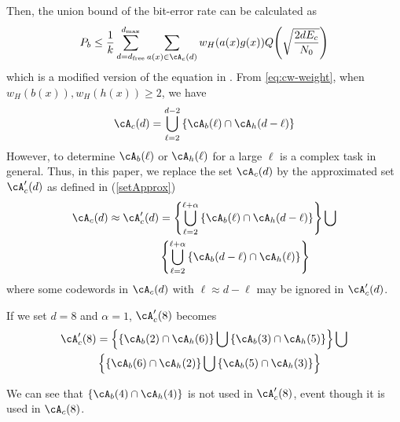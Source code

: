 Then, the union bound of the bit-error rate can be calculated as 
\begin{align}
P_b \leq \frac{1}{k} \sum_{d=d_{\text{free}}}^{d_{\text{max}}} \sum_{a(x) \in \cA_c(d)}w_H(a(x)g(x)) Q\Bigg( \sqrt{\frac{2dE_c}{N_0}}\Bigg)
\label{novelEq7}
\end{align}
which is a modified version of the equation in \cite{ref4} .
From \eqref{eq:cw-weight}, when $w_H(b(x)), w_H(h(x)) \geq 2$, we have
\begin{align}
\cA_c(d) = \bigcup_{\ell = 2}^{d-2} \left\{\cA_b(\ell) \cap \cA_h(d-\ell)\right\}
\label{Eq:exactset}
\end{align}
However, to determine $\cA_b(\ell)$ or $\cA_h(\ell)$ for a large $\ell$ is a complex task in general. Thus, in this paper, we replace the set $\cA_c(d)$ by the approximated set $\cA_c'(d)$ as defined in  (\ref{setApprox})
\begin{equation}
\begin{split}
\cA_c(d) \approx \cA_c'(d) &= \left\{\bigcup_{\ell = 2}^{\ell+\alpha} \left\{\cA_b(\ell) \cap \cA_h(d-\ell)\right\}\right\}\bigcup \\
&\left\{\bigcup_{\ell = 2}^{\ell+\alpha} \left\{\cA_b(d-\ell) \cap \cA_h(\ell)\right\}\right\}
\end{split}
\label{setApprox}
\end{equation}
where some codewords in $\cA_c(d)$ with $\ell \approx d-\ell$ may be ignored in $\cA_c'(d)$.
\begin{example}
If we set $d=8$ and  $\alpha=1$, $\cA_c'(8)$ becomes
\begin{equation*}
\begin{split}
\cA_c'(8) &=\left\{\left\{\cA_b(2) \cap \cA_h(6)\right\} \bigcup  \left\{\cA_b(3) \cap \cA_h(5)\right\} \right\} \bigcup \\
& \left\{\left\{\cA_b(6) \cap \cA_h(2)\right\} \bigcup  \left\{\cA_b(5) \cap \cA_h(3)\right\} \right\} \\
\end{split}
\end{equation*}

We can see that $\left\{\cA_b(4) \cap \cA_h(4)\right\}$ is not used in $\cA_c'(8)$, event though it is used in $\cA_c(8)$.
\end{example}





